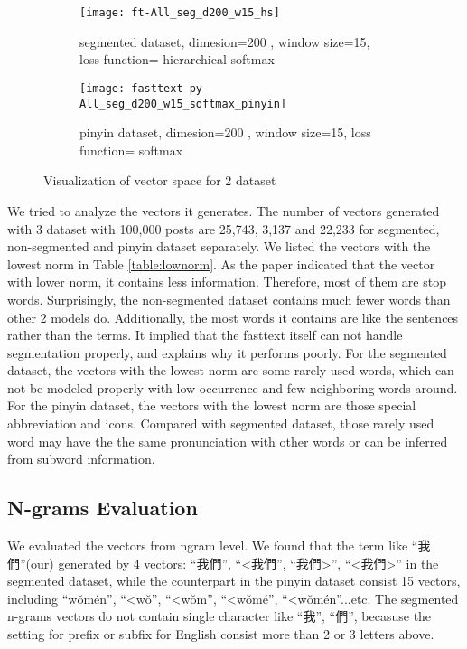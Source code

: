 \begin{figure}[H]
    \centering     
    \begin{subfigure}[b]{0.6\textwidth}
        \centering
        \texttt{[image: ft-All\_seg\_d200\_w15\_hs]}
        \caption{segmented dataset, dimesion=200 , window size=15, loss function=  hierarchical softmax}
    \end{subfigure}
    \begin{subfigure}[b]{0.6\textwidth}
        \centering
        \texttt{[image: fasttext-py-All\_seg\_d200\_w15\_softmax\_pinyin]}
        \caption{pinyin dataset,  dimesion=200 , window size=15, loss function= softmax}
    \end{subfigure}
    \caption{Visualization of vector space for 2 dataset}
    \label{tsne}
\end{figure}

We tried to analyze the vectors it generates. The number of vectors generated with 3 dataset with 100,000 posts are 25,743, 3,137 and 22,233 for segmented, non-segmented and pinyin dataset separately. 
We listed the vectors with the lowest norm in Table \ref{table:lownorm}. As the paper indicated that the vector with lower norm, it contains less information. 
Therefore, most of them are stop words. Surprisingly, the non-segmented dataset contains much fewer words than other 2 models do. 
Additionally, the most words it contains are like the sentences rather than the terms. It implied that the fasttext itself can not handle segmentation properly, and explains why it performs poorly. 
For the segmented dataset, the vectors with the lowest norm are some rarely used words, which can not be modeled properly with low occurrence and few neighboring words around.
For the pinyin dataset, the vectors with the lowest norm are those special abbreviation and icons. Compared with segmented dataset, those rarely used word may have the the same pronunciation with other words or can be inferred from subword information.


\subsection{N-grams Evaluation}

We evaluated the vectors from ngram level. We found that the term like \enquote{我們}(our) generated by 4 vectors: \enquote{我們}, \enquote{\textless 我們}, \enquote{我們\textgreater}, \enquote{\textless 我們\textgreater} in the segmented dataset,
while the counterpart in the pinyin dataset consist 15 vectors, including \enquote{wǒmén}, \enquote{\textless wǒ}, \enquote{\textless wǒm}, \enquote{\textless wǒmé}, \enquote{\textless wǒmén}...etc. 
The segmented n-grams vectors do not contain single character like \enquote{我}, \enquote{們}, becasuse the setting for prefix or subfix for English consist more than 2 or 3 letters above.

